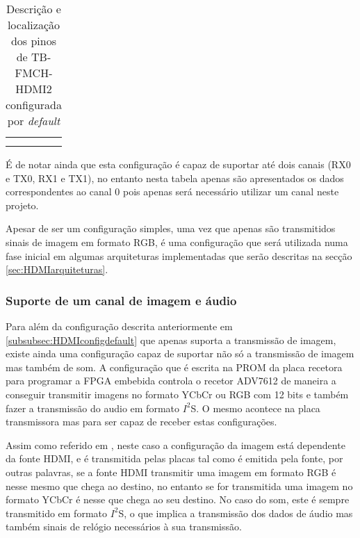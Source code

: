 \begin{table}[h!]
\begin{tabular}{|c|c|c|c|}
		&                                                                                       &                                                                                       &                                                                         \\
		&                                                                                       &                                                                                       &                                                                         \\ \hline
	\end{tabular}
	\caption{Descrição e localização dos pinos de TB-FMCH-HDMI2 configurada por \textit{default}}
	\label{table:HDMIdefaultSimplified}
\end{table}

É de notar ainda que esta configuração é capaz de suportar até dois canais (RX0 e TX0, RX1 e TX1), no entanto nesta tabela apenas são apresentados os dados correspondentes ao canal 0 pois apenas será necessário utilizar um canal neste projeto. 

Apesar de ser um configuração simples, uma vez que apenas são transmitidos sinais de imagem em formato RGB, é uma configuração que será utilizada numa fase inicial em algumas arquiteturas implementadas que serão descritas na secção \ref{sec:HDMIarquiteturas}.

\subsubsection{Suporte de um canal de imagem e áudio} \label {subsubsec:HDMIconfig+audio}

Para além da configuração descrita anteriormente em \ref{subsubsec:HDMIconfigdefault} que apenas suporta a transmissão de imagem, existe ainda uma configuração capaz de suportar não só a transmissão de imagem mas também de som. A configuração que é escrita na PROM da placa recetora para programar a FPGA embebida controla o recetor ADV7612 de maneira a conseguir transmitir imagens no formato YCbCr ou RGB com 12 bits e também fazer a transmissão do audio em formato $I^{2}$S. O mesmo acontece na placa transmissora mas para ser capaz de receber estas configurações.

Assim como referido em \cite{R014}, neste caso a configuração da imagem está dependente da fonte HDMI, e é transmitida pelas placas tal como é emitida pela fonte, por outras palavras, se a fonte HDMI transmitir uma imagem em formato RGB é nesse mesmo que chega ao destino, no entanto se for transmitida uma imagem no formato YCbCr é nesse que chega ao seu destino. No caso do som, este é sempre transmitido em formato $I^{2}$S, o que implica a transmissão dos dados de áudio mas também sinais de relógio necessários à sua transmissão.

